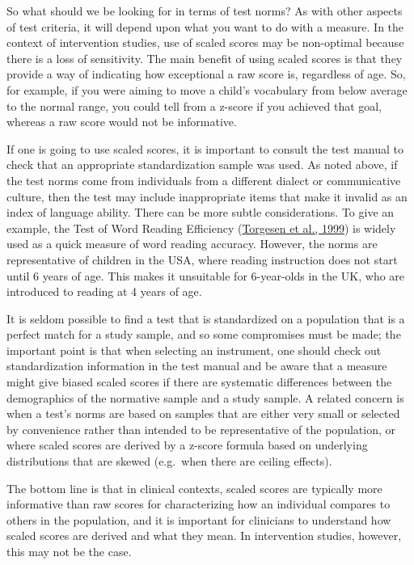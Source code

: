 \documentclass{krantz}
\begin{document}
So what should we be looking for in terms of test norms? As with other aspects of test criteria, it will depend upon what you want to do with a measure. In the context of intervention studies, use of scaled scores may be non-optimal because there is a loss of sensitivity. The main benefit of using scaled scores is that they provide a way of indicating how exceptional a raw score is, regardless of age. So, for example, if you were aiming to move a child's vocabulary from below average to the normal range, you could tell from a z-score if you achieved that goal, whereas a raw score would not be informative.

If one is going to use scaled scores, it is important to consult the test manual to check that an appropriate standardization sample was used. As noted above, if the test norms come from individuals from a different dialect or communicative culture, then the test may include inappropriate items that make it invalid as an index of language ability. There can be more subtle considerations. To give an example, the Test of Word Reading Efficiency (\protect\hyperlink{ref-torgesen1999}{Torgesen et al., 1999}) is widely used as a quick measure of word reading accuracy. However, the norms are representative of children in the USA, where reading instruction does not start until 6 years of age. This makes it unsuitable for 6-year-olds in the UK, who are introduced to reading at 4 years of age.

It is seldom possible to find a test that is standardized on a population that is a perfect match for a study sample, and so some compromises must be made; the important point is that when selecting an instrument, one should check out standardization information in the test manual and be aware that a measure might give biased scaled scores if there are systematic differences between the demographics of the normative sample and a study sample. A related concern is when a test's norms are based on samples that are either very small or selected by convenience rather than intended to be representative of the population, or where scaled scores are derived by a z-score formula based on underlying distributions that are skewed (e.g.~when there are ceiling effects).

The bottom line is that in clinical contexts, scaled scores are typically more informative than raw scores for characterizing how an individual compares to others in the population, and it is important for clinicians to understand how scaled scores are derived and what they mean. In intervention studies, however, this may not be the case.
\end{document}
